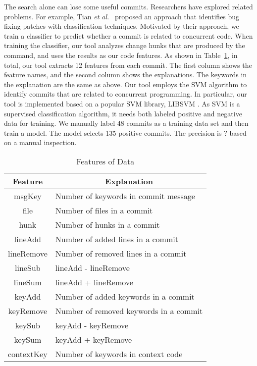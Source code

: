 The search alone can lose some useful commits. Researchers have explored related problems. For example, Tian \emph{et al.}~\cite{tian2012identifying} proposed an approach that identifies bug fixing patches with classification techniques. Motivated by their approach, we train a classifier to predict whether a commit is related to concurrent code. When training the classifier, our tool analyzes change hunks that are produced by the  command, and uses the results as our code features. As shown in Table~\ref{table:feature}, in total, our tool extracts 12 features from each commit. The first column shows the feature names, and the second column shows the explanations. The keywords in the explanation are the same as above. Our tool employs the SVM \cite{journals/ml/CortesV95} algorithm to identify commits that are related to concurrent programming. In particular, our tool is implemented based on a popular SVM library, LIBSVM \cite{libsvm}. As SVM is a supervised classification algorithm, it needs both labeled positive and negative data for training. We manually label 48 commits as a training data set and then train a model. The model selects 135 positive commits. The precision is ? based on a manual inspection.




\begin{table}
	\centering
	\caption{Features of Data}\vspace*{-2ex}
	\label{table:feature}
	\begin{tabular}{|c|l|}\hline
		Feature&\multicolumn{1}{|c|}{Explanation}\\\hline
		msgKey&Number of keywords in commit message\\
		file&Number of files in a commit\\
		hunk&Number of hunks in a commit\\
		lineAdd&Number of added lines in a commit\\
		lineRemove&Number of removed lines in a commit\\
		lineSub&lineAdd - lineRemove\\
		lineSum&lineAdd + lineRemove\\
		keyAdd&Number of added keywords in a commit\\
		keyRemove&Number of removed keywords in a commit\\
		keySub&keyAdd - keyRemove\\
		keySum&keyAdd + keyRemove\\
		contextKey&Number of keywords in context code\\\hline
	\end{tabular}\vspace*{-3ex}
\end{table}

